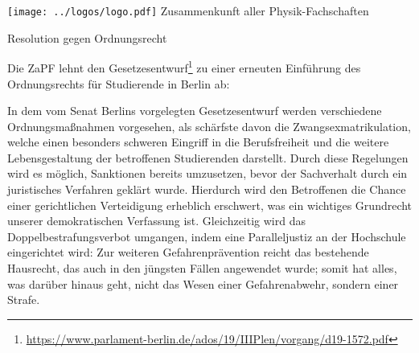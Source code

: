 \documentclass[DIV=calc]{scrartcl}
\begin{document}
\hspace{0.87\textwidth}
\begin{minipage}{120pt}
	\vspace{-1.8cm}
	\texttt{[image: ../logos/logo.pdf]}
	\centering
	\small Zusammenkunft aller Physik-Fachschaften
\end{minipage}

\begin{center}
  \huge{Resolution gegen Ordnungsrecht}\vspace{.25\baselineskip}\\
  \normalsize
\end{center}
\vspace{1cm}







Die ZaPF lehnt den Gesetzesentwurf\footnote{\url{https://www.parlament-berlin.de/ados/19/IIIPlen/vorgang/d19-1572.pdf}} zu einer erneuten Einführung des Ordnungsrechts für Studierende in Berlin ab:

In dem vom Senat Berlins vorgelegten Gesetzesentwurf werden verschiedene Ordnungsmaßnahmen vorgesehen, als schärfste davon die Zwangsexmatrikulation, welche einen besonders schweren Eingriff in die Berufsfreiheit und die weitere Lebensgestaltung der betroffenen Studierenden darstellt. Durch diese Regelungen wird es möglich, Sanktionen bereits umzusetzen, bevor der Sachverhalt durch ein juristisches Verfahren geklärt wurde. Hierdurch wird den Betroffenen die Chance einer gerichtlichen Verteidigung erheblich erschwert, was ein wichtiges Grundrecht unserer demokratischen Verfassung ist. Gleichzeitig wird das Doppelbestrafungsverbot umgangen, indem eine Paralleljustiz an der Hochschule eingerichtet wird: Zur weiteren Gefahrenprävention reicht das bestehende Hausrecht, das auch in den jüngsten Fällen angewendet wurde; somit hat alles, was darüber hinaus geht, nicht das Wesen einer Gefahrenabwehr, sondern einer Strafe.
\end{document}
